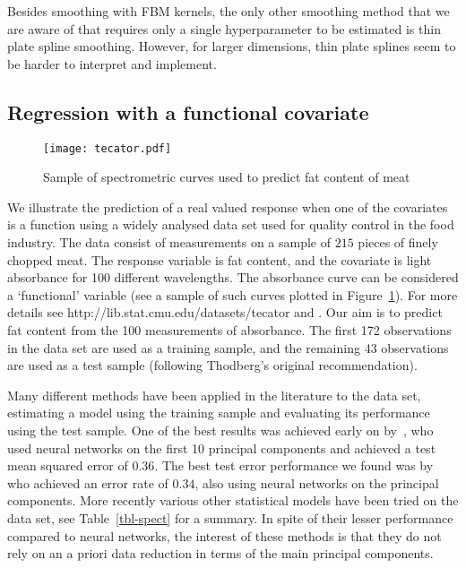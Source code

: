 \documentclass[preprint,12pt,authoryear]{elsarticle}
\begin{document}
Besides smoothing with FBM kernels, the only other smoothing method that we are aware of that requires only a single hyperparameter to be estimated is thin plate spline smoothing. However, for larger dimensions, thin plate splines seem to be harder to interpret and implement. 




\subsection{Regression with a functional covariate}

\begin{figure}[tbp]
	\centering
	{\texttt{[image: tecator.pdf]}}
	\caption{Sample of spectrometric curves used to predict fat content of meat}\label{fig-tecator}
\end{figure}

We illustrate the prediction of a real valued response when one of the covariates is a function using a widely analysed data set used for quality control in the food industry.
The data consist of measurements on a sample of $215$ pieces of finely chopped meat. The response variable is fat content, and the covariate is light absorbance for 100 different wavelengths.
The absorbance curve can be considered a `functional' variable (see a sample of such curves plotted in Figure~\ref{fig-tecator}).
For more details see http://lib.stat.cmu.edu/datasets/tecator and \citet{thodberg96}. %
Our aim is to predict fat content from the 100 measurements of absorbance.
The first 172 observations in the data set are used as a training sample, and the remaining 43 observations are used as a test sample (following Thodberg's original recommendation).

Many different methods have been applied in the literature to the data set, estimating a model using the training sample and evaluating its performance using the test sample.
One of the best results was achieved early on by~\citet{thodberg96}, who used neural networks on the first 10 principal components and achieved a test mean squared error of $0.36$.
The best test error performance we found was by \citet{vw00} who achieved an error rate of $0.34$, also using neural networks on the principal components.
More recently various other statistical models have been tried on the data set, see  Table~\ref{tbl-spect} for a summary. In spite of their lesser performance compared to neural networks, the interest of these methods is that they do not rely on an a priori data reduction in terms of the main principal components. 
\end{document}
